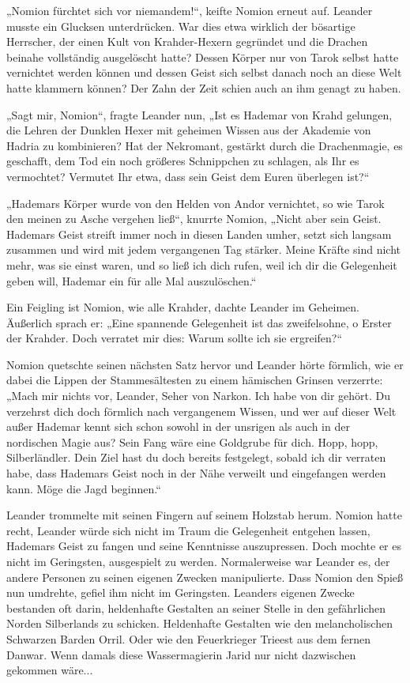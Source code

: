„Nomion fürchtet sich vor niemandem!“, keifte Nomion erneut auf. Leander musste ein Glucksen unterdrücken. War dies etwa wirklich der bösartige Herrscher, der einen Kult von Krahder-Hexern gegründet und die Drachen beinahe vollständig ausgelöscht hatte? Dessen Körper nur von Tarok selbst hatte vernichtet werden können und dessen Geist sich selbst danach noch an diese Welt hatte klammern können? Der Zahn der Zeit schien auch an ihm genagt zu haben.

„Sagt mir, Nomion“, fragte Leander nun, „Ist es Hademar von Krahd gelungen, die Lehren der Dunklen Hexer mit geheimen Wissen aus der Akademie von Hadria zu kombinieren? Hat der Nekromant, gestärkt durch die Drachenmagie, es geschafft, dem Tod ein noch größeres Schnippchen zu schlagen, als Ihr es vermochtet? Vermutet Ihr etwa, dass sein Geist dem Euren überlegen ist?“

„Hademars Körper wurde von den Helden von Andor vernichtet, so wie Tarok den meinen zu Asche vergehen ließ“, knurrte Nomion, „Nicht aber sein Geist. Hademars Geist streift immer noch in diesen Landen umher, setzt sich langsam zusammen und wird mit jedem vergangenen Tag stärker. Meine Kräfte sind nicht mehr, was sie einst waren, und so ließ ich dich rufen, weil ich dir die Gelegenheit geben will, Hademar ein für alle Mal auszulöschen.“

Ein Feigling ist Nomion, wie alle Krahder, dachte Leander im Geheimen. Äußerlich sprach er: „Eine spannende Gelegenheit ist das zweifelsohne, o Erster der Krahder. Doch verratet mir dies: Warum sollte ich sie ergreifen?“

Nomion quetschte seinen nächsten Satz hervor und Leander hörte förmlich, wie er dabei die Lippen der Stammesältesten zu einem hämischen Grinsen verzerrte: „Mach mir nichts vor, Leander, Seher von Narkon. Ich habe von dir gehört. Du verzehrst dich doch förmlich nach vergangenem Wissen, und wer auf dieser Welt außer Hademar kennt sich schon sowohl in der unsrigen als auch in der nordischen Magie aus? Sein Fang wäre eine Goldgrube für dich. Hopp, hopp, Silberländler. Dein Ziel hast du doch bereits festgelegt, sobald ich dir verraten habe, dass Hademars Geist noch in der Nähe verweilt und eingefangen werden kann. Möge die Jagd beginnen.“

Leander trommelte mit seinen Fingern auf seinem Holzstab herum. Nomion hatte recht, Leander würde sich nicht im Traum die Gelegenheit entgehen lassen, Hademars Geist zu fangen und seine Kenntnisse auszupressen. Doch mochte er es nicht im Geringsten, ausgespielt zu werden. Normalerweise war Leander es, der andere Personen zu seinen eigenen Zwecken manipulierte. Dass Nomion den Spieß nun umdrehte, gefiel ihm nicht im Geringsten. Leanders eigenen Zwecke bestanden oft darin, heldenhafte Gestalten an seiner Stelle in den gefährlichen Norden Silberlands zu schicken. Heldenhafte Gestalten wie den melancholischen Schwarzen Barden Orril. Oder wie den Feuerkrieger Trieest aus dem fernen Danwar. Wenn damals diese Wassermagierin Jarid nur nicht dazwischen gekommen wäre...

